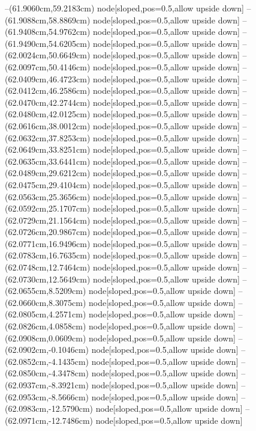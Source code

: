 --(61.9060cm,59.2183cm) node[sloped,pos=0.5,allow upside down]{\ArrowIn}
--(61.9088cm,58.8869cm) node[sloped,pos=0.5,allow upside down]{\arrowIn}
--(61.9408cm,54.9762cm) node[sloped,pos=0.5,allow upside down]{\ArrowIn}
--(61.9490cm,54.6205cm) node[sloped,pos=0.5,allow upside down]{\arrowIn}
--(62.0024cm,50.6649cm) node[sloped,pos=0.5,allow upside down]{\ArrowIn}
--(62.0097cm,50.4146cm) node[sloped,pos=0.5,allow upside down]{\arrowIn}
--(62.0409cm,46.4723cm) node[sloped,pos=0.5,allow upside down]{\ArrowIn}
--(62.0412cm,46.2586cm) node[sloped,pos=0.5,allow upside down]{\arrowIn}
--(62.0470cm,42.2744cm) node[sloped,pos=0.5,allow upside down]{\ArrowIn}
--(62.0480cm,42.0125cm) node[sloped,pos=0.5,allow upside down]{\arrowIn}
--(62.0616cm,38.0012cm) node[sloped,pos=0.5,allow upside down]{\ArrowIn}
--(62.0632cm,37.8253cm) node[sloped,pos=0.5,allow upside down]{\arrowIn}
--(62.0649cm,33.8251cm) node[sloped,pos=0.5,allow upside down]{\ArrowIn}
--(62.0635cm,33.6441cm) node[sloped,pos=0.5,allow upside down]{\arrowIn}
--(62.0489cm,29.6212cm) node[sloped,pos=0.5,allow upside down]{\ArrowIn}
--(62.0475cm,29.4104cm) node[sloped,pos=0.5,allow upside down]{\arrowIn}
--(62.0563cm,25.3656cm) node[sloped,pos=0.5,allow upside down]{\ArrowIn}
--(62.0592cm,25.1707cm) node[sloped,pos=0.5,allow upside down]{\arrowIn}
--(62.0729cm,21.1564cm) node[sloped,pos=0.5,allow upside down]{\ArrowIn}
--(62.0726cm,20.9867cm) node[sloped,pos=0.5,allow upside down]{\arrowIn}
--(62.0771cm,16.9496cm) node[sloped,pos=0.5,allow upside down]{\ArrowIn}
--(62.0783cm,16.7635cm) node[sloped,pos=0.5,allow upside down]{\arrowIn}
--(62.0748cm,12.7464cm) node[sloped,pos=0.5,allow upside down]{\ArrowIn}
--(62.0730cm,12.5649cm) node[sloped,pos=0.5,allow upside down]{\arrowIn}
--(62.0655cm,8.5209cm) node[sloped,pos=0.5,allow upside down]{\ArrowIn}
--(62.0660cm,8.3075cm) node[sloped,pos=0.5,allow upside down]{\arrowIn}
--(62.0805cm,4.2571cm) node[sloped,pos=0.5,allow upside down]{\ArrowIn}
--(62.0826cm,4.0858cm) node[sloped,pos=0.5,allow upside down]{\arrowIn}
--(62.0908cm,0.0609cm) node[sloped,pos=0.5,allow upside down]{\ArrowIn}
--(62.0902cm,-0.1046cm) node[sloped,pos=0.5,allow upside down]{\arrowIn}
--(62.0852cm,-4.1435cm) node[sloped,pos=0.5,allow upside down]{\ArrowIn}
--(62.0850cm,-4.3478cm) node[sloped,pos=0.5,allow upside down]{\arrowIn}
--(62.0937cm,-8.3921cm) node[sloped,pos=0.5,allow upside down]{\ArrowIn}
--(62.0953cm,-8.5666cm) node[sloped,pos=0.5,allow upside down]{\arrowIn}
--(62.0983cm,-12.5790cm) node[sloped,pos=0.5,allow upside down]{\ArrowIn}
--(62.0971cm,-12.7486cm) node[sloped,pos=0.5,allow upside down]{\arrowIn}

